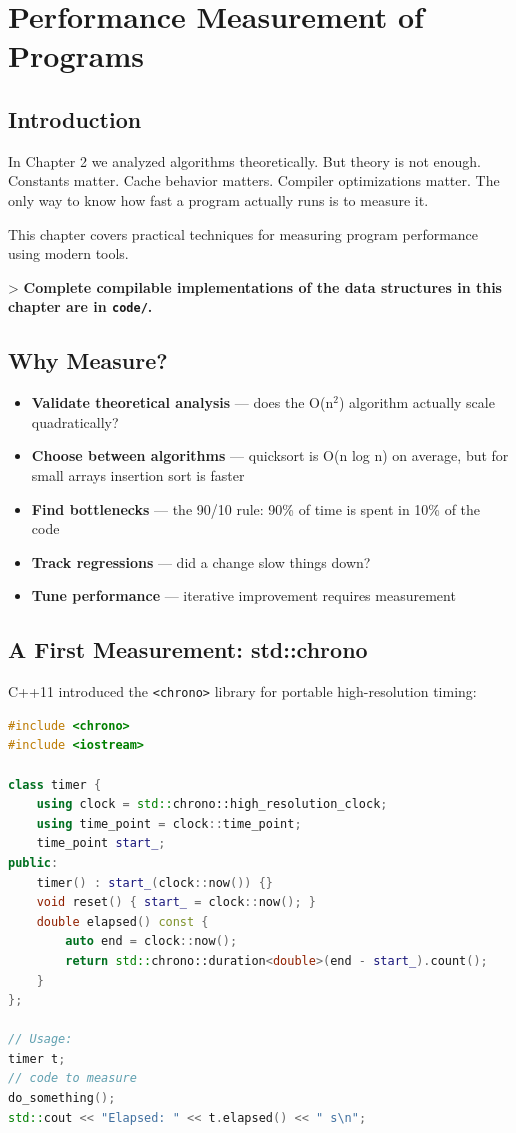 \chapter{Performance Measurement of Programs}\label{ch03:performance-measurement-of-programs}

\section{Introduction}

In Chapter 2 we analyzed algorithms theoretically. But theory is not enough. Constants matter. Cache behavior matters. Compiler optimizations matter. The only way to know how fast a program actually runs is to measure it.

This chapter covers practical techniques for measuring program performance using modern tools.

> \textbf{Complete compilable implementations of the data structures in this chapter are in \texttt{code/}.}

\section{Why Measure?}

\begin{itemize}
\item \textbf{Validate theoretical analysis} — does the O(n$^{2}$) algorithm actually scale quadratically?
\item \textbf{Choose between algorithms} — quicksort is O(n log n) on average, but for small arrays insertion sort is faster
\item \textbf{Find bottlenecks} — the 90/10 rule: 90\% of time is spent in 10\% of the code
\item \textbf{Track regressions} — did a change slow things down?
\item \textbf{Tune performance} — iterative improvement requires measurement
\end{itemize}

\section{A First Measurement: std::chrono}

C++11 introduced the \texttt{<chrono>} library for portable high-resolution timing:

\begin{lstlisting}[language=C++]
#include <chrono>
#include <iostream>

class timer {
    using clock = std::chrono::high_resolution_clock;
    using time_point = clock::time_point;
    time_point start_;
public:
    timer() : start_(clock::now()) {}
    void reset() { start_ = clock::now(); }
    double elapsed() const {
        auto end = clock::now();
        return std::chrono::duration<double>(end - start_).count();
    }
};

// Usage:
timer t;
// code to measure
do_something();
std::cout << "Elapsed: " << t.elapsed() << " s\n";
\end{lstlisting}

